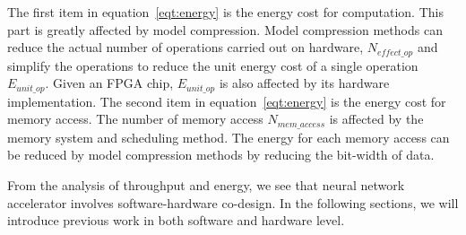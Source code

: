 The first item in equation~\ref{eqt:energy} is the energy cost for computation. This part is greatly affected by model compression. Model compression methods can reduce the actual number of operations carried out on hardware, $N_{effect\_op}$ and simplify the operations to reduce the unit energy cost of a single operation $E_{unit\_op}$. Given an FPGA chip, $E_{unit\_op}$ is also affected by its hardware implementation. The second item in equation~\ref{eqt:energy} is the energy cost for memory access. The number of memory access $N_{mem\_access}$ is affected by the memory system and scheduling method. The energy for each memory access can be reduced by model compression methods by reducing the bit-width of data. 

From the analysis of throughput and energy, we see that neural network accelerator involves software-hardware co-design. In the following sections, we will introduce previous work in both software and hardware level. 
